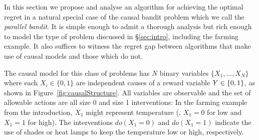 In this section we propose and analyse an algorithm for achieving the optimal regret in a natural special 
case of the causal bandit problem which we call the {\it parallel bandit}.
It is simple enough to admit a thorough analysis but rich enough to model the type of problem discussed in \S\ref{sec:intro}, including the farming example. 
It also suffices to witness the regret gap between algorithms that make use of causal models and those which do not.

The causal model for this class of problems has $N$ binary variables $\{ X_1, \ldots, X_N \}$ where each $X_i \in \{0,1\}$ are independent causes of a 
reward variable $Y \in \left\{0,1\right\}$, as shown in Figure~\ref{fig:causalStructure}.
All variables are observable and the set of allowable actions are all size 0 and size 1 interventions: 
In the farming example from the introduction, $X_1$ might represent temperature (\eg, $X_1=0$ for low and $X_1=1$ for high). 
The interventions $do(X_1 = 0)$ and $do(X_1 = 1)$ indicate the use of shades or heat lamps to keep the temperature low or high, respectively.

